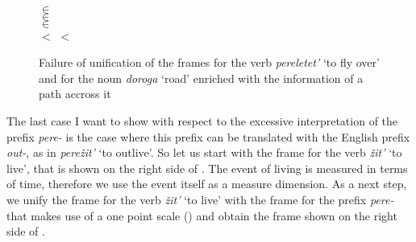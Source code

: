 \begin{figure}
\small
\begin{minipage}{0.7\textwidth}\centering
{}
\end{minipage}
\begin{minipage}{0.25\textwidth}\centering
{}\\
 $\in$ \\
 $\in$ \\
 $\in$ \\
 $<$  $<$ 
\end{minipage}
\caption{Failure of unification of the frames for the verb \textit{pereletet'} `to fly over' and for the noun \textit{doroga} `road' enriched with the information of a path accross it  \label{frame:pere:letet:road:red}}
\end{figure}

The last case I want to show with respect to the excessive  interpretation of the prefix \textit{pere-}   is the case where this prefix can be translated with the English prefix \textit{out-}, as in \textit{pere\v{z}it'} `to outlive'. So let us start with the frame for the verb \textit{\v{z}it'} `to live', that is shown on the right side of . The event of living is measured in terms of time, therefore we use the event itself as a measure dimension. As a next step, we unify the frame for the verb \textit{\v{z}it'} `to live' with the frame for the prefix \textit{pere-}   that makes use of a one point scale () and obtain the frame shown on the right side of .


